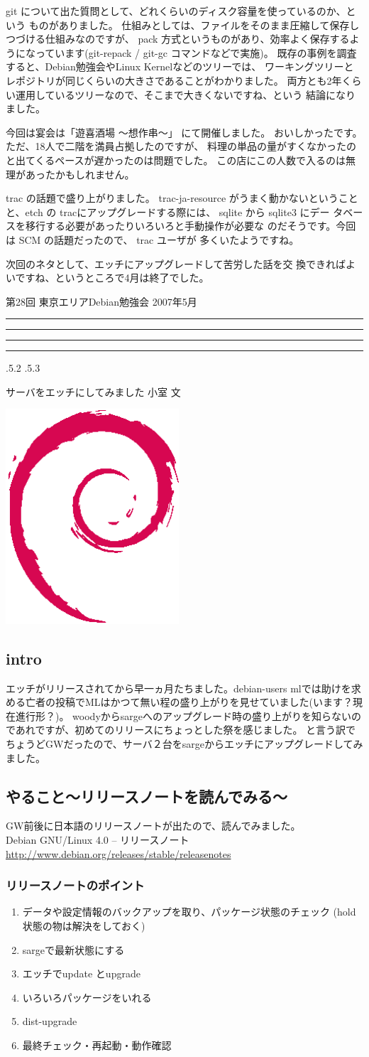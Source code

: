 \documentclass[mingoth,a4paper]{jsarticle}
\makeatletter
\newcommand{\debmtgyear}{2007}
\newcommand{\debmtgmonth}{5}
\newcommand{\debmtgnumber}{28}
\renewcommand{\section}{\@startsection{section}{1}{\z@}%
    {\Cvs \@plus.5\Cdp \@minus.2\Cdp}%
    {.5\Cvs \@plus.3\Cdp}%
    {\normalfont\gt\fontsize{26}{26}\headfont\raggedright}} %
\newcommand{\dancersection}[2]{%
\newpage
第\debmtgnumber{}回 東京エリアDebian勉強会 \debmtgyear{}年\debmtgmonth{}月
\hrule
\vspace{0.5mm}
\hrule
%
\vspace{4cm}
\hrule
\vspace{0.5mm}
\hrule
%
\vspace{-7cm}
\begin{minipage}[b]{0.7\hsize}
\section{#1}
\hfill{}#2\\
\vspace{2cm}
\end{minipage}
\begin{minipage}[b]{0.3\hsize}
\hfill{}\includegraphics[height=8cm]{image200502/openlogo-nd.eps}\\
\end{minipage}
%
\vspace{-1cm}
}
\makeatother
\begin{document}
git について出た質問として、どれくらいのディスク容量を使っているのか、という
ものがありました。
仕組みとしては、ファイルをそのまま圧縮して保存しつづける仕組みなのですが、
pack 方式というものがあり、効率よく保存するようになっています(git-repack / git-gc コマンドなどで実施)。
既存の事例を調査すると、Debian勉強会やLinux Kernelなどのツリーでは、
ワーキングツリーとレポジトリが同じくらいの大きさであることがわかりました。
両方とも2年くらい運用しているツリーなので、そこまで大きくないですね、という
結論になりました。


今回は宴会は「遊喜酒場 〜想作串〜」
にて開催しました。
おいしかったです。
ただ、18人で二階を満員占拠したのですが、
料理の単品の量がすくなかったのと出てくるペースが遅かったのは問題でした。
この店にこの人数で入るのは無理があったかもしれません。

trac の話題で盛り上がりました。
trac-ja-resource がうまく動かないということと、etch の 
tracにアップグレードする際には、 sqlite から sqlite3 にデー
タベースを移行する必要があったりいろいろと手動操作が必要な
のだそうです。今回は SCM の話題だったので、 trac ユーザが
多くいたようですね。


次回のネタとして、エッチにアップグレードして苦労した話を交
換できればよいですね、というところで4月は終了でした。

\dancersection{サーバをエッチにしてみました}{小室 文}

\subsection{intro}
エッチがリリースされてから早一ヵ月たちました。debian-users mlでは助けを求める亡者の投稿でMLはかつて無い程の盛り上がりを見せていました(います？現在進行形？)。
woodyからsargeへのアップグレード時の盛り上がりを知らないのであれですが、初めてのリリースにちょっとした祭を感じました。
と言う訳でちょうどGWだったので、サーバ２台をsargeからエッチにアップグレードしてみました。

\subsection{やること〜リリースノートを読んでみる〜}
GW前後に日本語のリリースノートが出たので、読んでみました。\\
Debian GNU/Linux 4.0 -- リリースノート\\
\url{http://www.debian.org/releases/stable/releasenotes}

\subsubsection{リリースノートのポイント}
\begin{enumerate}
\item データや設定情報のバックアップを取り、パッケージ状態のチェック (hold状態の物は解決をしておく)
\item sargeで最新状態にする

\item エッチでupdate とupgrade
\item いろいろパッケージをいれる

\item dist-upgrade
\item 最終チェック・再起動・動作確認
\end{enumerate}
\end{document}
